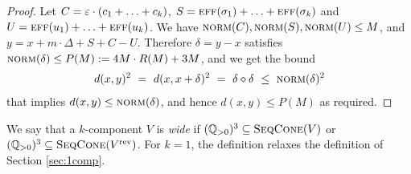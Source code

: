 \begin{proof}
Let $C = \varepsilon \cdot (c_1 + \ldots + c_k)$, 
$S = \textsc{eff}(\sigma_1) + \ldots + \textsc{eff}(\sigma_k)$ and $U=\textsc{eff}(u_1) + \ldots + \textsc{eff}(u_k)$. 
We have $\textsc{norm}(C), \textsc{norm}(S), \textsc{norm}(U) \leq M$, and
$y = x + m\cdot \Delta + S + C - U$.
Therefore $\delta = y - x$ satisfies $\textsc{norm}(\delta) \leq P(M) := 4M\cdot R(M) + 3M$, and we get the bound
\begin{align*}
d(x, y)^2 \ = \ d(x, x + \delta)^2 \ = \ \delta \diamond \delta \ \leq \ \textsc{norm}(\delta)^2  
\end{align*}
that implies $d(x,y) \leq \textsc{norm}(\delta)$, and hence $d(x,y) \leq P(M)$ as required.
\end{proof}
%
We say that a $k$-component \tvass $V$ is \emph{wide} if $(\mathbb{Q}_{>0})^3 \subseteq \textsc{SeqCone}(V)$
or $(\mathbb{Q}_{>0})^3 \subseteq \textsc{SeqCone}({V}^{\text{rev}})$.
For $k=1$, the definition relaxes the definition of Section \ref{sec:1comp}. 



